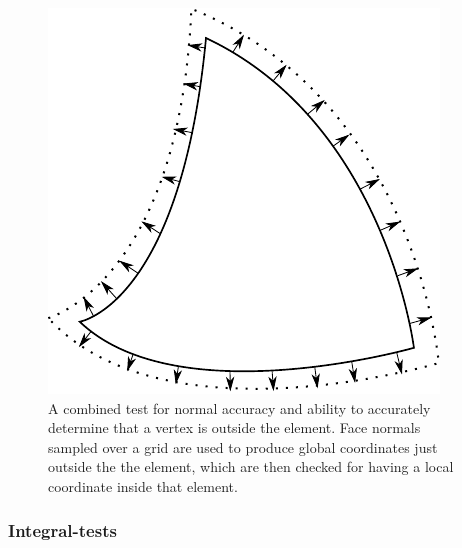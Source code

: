 \begin{figure}
    \centering
    \includegraphics[scale=1.0]{images/normaltest}
	\captionsetup{width=0.8\textwidth} 
	\caption{ A combined test for normal accuracy and ability to accurately determine that a vertex is outside the element. Face normals sampled over a grid are used to produce global coordinates just outside the the element, which are then checked for having a local coordinate inside that element. }
	\label{fig:geometry:test:normal}
\end{figure}

\subsubsection{Integral-tests}

